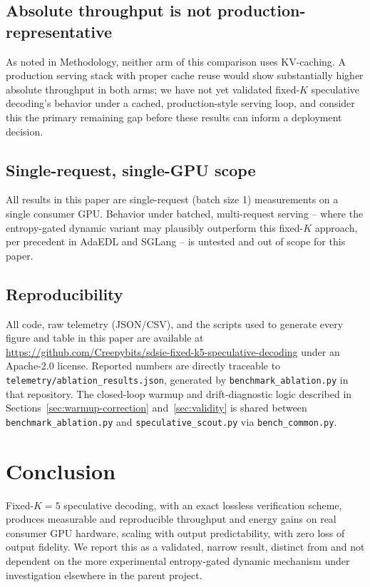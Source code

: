 \documentclass[conference]{IEEEtran}
\begin{document}
\subsection{Absolute throughput is not production-representative}

As noted in Methodology, neither arm of this comparison uses KV-caching.
A production serving stack with proper cache reuse would show substantially
higher absolute throughput in both arms; we have not yet validated
fixed-$K$ speculative decoding's behavior under a cached, production-style
serving loop, and consider this the primary remaining gap before these
results can inform a deployment decision.

\subsection{Single-request, single-GPU scope}

All results in this paper are single-request (batch size 1) measurements
on a single consumer GPU. Behavior under batched, multi-request serving --
where the entropy-gated dynamic variant may plausibly outperform this
fixed-$K$ approach, per precedent in AdaEDL and SGLang -- is untested and
out of scope for this paper.

\subsection{Reproducibility}

All code, raw telemetry (JSON/CSV), and the scripts used to generate every
figure and table in this paper are available at
\url{https://github.com/Creepybits/sdsie-fixed-k5-speculative-decoding}
under an Apache-2.0 license. Reported numbers are directly traceable to
\texttt{telemetry/ablation\_results.json}, generated by
\texttt{benchmark\_ablation.py} in that repository. The closed-loop warmup
and drift-diagnostic logic described in Sections~\ref{sec:warmup-correction}
and~\ref{sec:validity} is shared between \texttt{benchmark\_ablation.py} and
\texttt{speculative\_scout.py} via \texttt{bench\_common.py}.

\section{Conclusion}

Fixed-$K{=}5$ speculative decoding, with an exact lossless verification
scheme, produces measurable and reproducible throughput and energy gains
on real consumer GPU hardware, scaling with output predictability, with
zero loss of output fidelity. We report this as a validated, narrow result,
distinct from and not dependent on the more experimental entropy-gated
dynamic mechanism under investigation elsewhere in the parent project.
\end{document}
